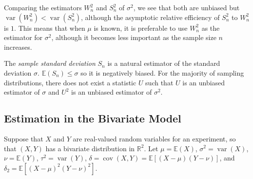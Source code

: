 \documentclass[a4paper,12pt]{article}
\theoremstyle{definition}
\theoremstyle{definition}
\theoremstyle{definition}
\newcommand{\var}{\operatorname{var}}
\newcommand{\cov}{\operatorname{cov}}
\begin{document}
    Comparing the estimators $W_n^2$ and $S_n^2$ of $\sigma^2$, we see that both are unbiased but $\var(W_n^2) < \var(S_n^2)$, although the asymptotic relative efficiency of $S_n^2$ to $W_n^2$ is $1$. This means that when $\mu$ is known, it is preferable to use $W_n^2$ as the estimator for $\sigma^2$, although it becomes less important as the sample size $n$ increases. \par
    The \textit{sample standard deviation} $S_n$ is a natural estimator of the standard deviation $\sigma$. $\mathbb{E}(S_n) \leq \sigma$ so it is negatively biased. For the majority of sampling distributions, there does not exist a statistic $U$ such that $U$ is an unbiased estimator of $\sigma$ and $U^2$ is an unbiased estimator of $\sigma^2$.

    \subsection*{Estimation in the Bivariate Model}
    Suppose that $X$ and $Y$ are real-valued random variables for an experiment, so that $(X, Y)$ has a bivariate distribution in $\mathbb{R}^2$. Let $\mu = \mathbb{E}(X)$, $\sigma^2 = \var(X)$, $\nu = \mathbb{E}(Y)$, $\tau^2 = \var(Y)$, $\delta = \cov(X, Y) = \mathbb{E}[(X - \mu)(Y - \nu)]$, and $\delta_2 = \mathbb{E} \left[ (X - \mu)^2 (Y - \nu)^2 \right]$.
\end{document}
